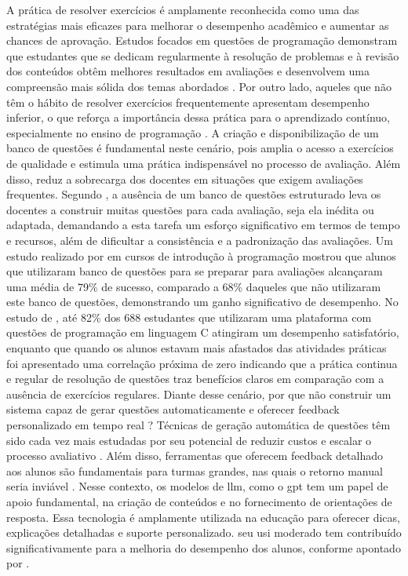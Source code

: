 A prática de resolver exercícios é amplamente reconhecida como uma das estratégias mais eficazes para melhorar o desempenho acadêmico e aumentar as chances de aprovação. Estudos focados em questões de programação demonstram que estudantes que se dedicam regularmente à resolução de problemas e à revisão dos conteúdos obtêm melhores resultados em avaliações e desenvolvem uma compreensão mais sólida dos temas abordados \parencite{Ahadi2016}. Por outro lado, aqueles que não têm o hábito de resolver exercícios frequentemente apresentam desempenho inferior, o que reforça a importância dessa prática para o aprendizado contínuo, especialmente no ensino de programação \parencite{Edwards2019}.  A criação e disponibilização de um banco de questões é fundamental neste cenário, pois amplia o acesso a exercícios de qualidade e estimula uma prática indispensável no processo de avaliação. Além disso, reduz a sobrecarga dos docentes em situações que exigem avaliações frequentes. Segundo \parencite{Puthiaparampil2020}, a ausência de um banco de questões estruturado leva os docentes a construir muitas questões  para cada avaliação, seja ela inédita ou adaptada,  demandando a esta tarefa um esforço significativo em termos de tempo e recursos, além de dificultar a consistência e a padronização das avaliações.  Um estudo realizado por \parencite{fossati2020} em cursos de introdução à programação mostrou que alunos que utilizaram banco de questões para se preparar para avaliações alcançaram uma média de 79\% de sucesso, comparado a 68\% daqueles que não utilizaram este banco de questões, demonstrando um ganho significativo de desempenho. No estudo de \parencite{Rodriguez2024}, até 82\% dos 688  estudantes que utilizaram uma plataforma com questões de programação em linguagem C atingiram um desempenho satisfatório, enquanto que quando os alunos estavam mais afastados das atividades práticas foi apresentado uma correlação próxima de zero indicando que a prática continua e regular de resolução de questões traz benefícios claros em comparação com a ausência de exercícios regulares.
Diante desse cenário, por que não construir um sistema capaz de gerar questões automaticamente e oferecer feedback personalizado em tempo real ? Técnicas de geração automática de questões têm sido cada vez mais estudadas por seu potencial de reduzir custos e escalar o processo avaliativo \parencite{kurdi2020, sewunetie2022}. Além disso, ferramentas que oferecem feedback detalhado aos alunos são fundamentais para turmas grandes, nas quais o retorno manual seria inviável \parencite{vanpraet2024, fung2024}. 
Nesse contexto, os modelos de \gls{llm}, como o \gls{gpt} tem um papel de apoio fundamental, na criação de conteúdos e no fornecimento de orientações de resposta. Essa tecnologia é amplamente utilizada na educação para oferecer dicas,  explicações detalhadas e suporte personalizado. seu usi moderado tem contribuído significativamente para a melhoria do desempenho dos alunos, conforme apontado por \parencite{yang2024}. 

